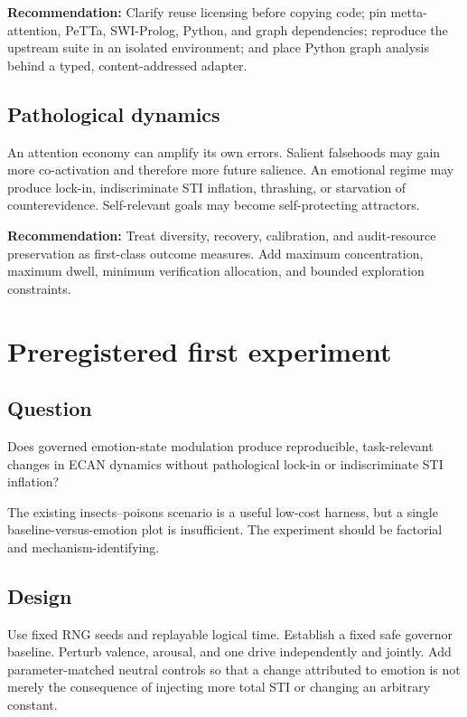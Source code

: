 \documentclass[11pt]{article}
\newcommand{\rec}{\textbf{Recommendation:} }
\begin{document}
\rec Clarify reuse licensing before copying code; pin metta-attention, PeTTa,
SWI-Prolog, Python, and graph dependencies; reproduce the upstream suite in an
isolated environment; and place Python graph analysis behind a typed,
content-addressed adapter.

\subsection{Pathological dynamics}

An attention economy can amplify its own errors.  Salient falsehoods may gain
more co-activation and therefore more future salience.  An emotional regime may
produce lock-in, indiscriminate STI inflation, thrashing, or starvation of
counterevidence.  Self-relevant goals may become self-protecting attractors.

\rec Treat diversity, recovery, calibration, and audit-resource preservation
as first-class outcome measures.  Add maximum concentration, maximum dwell,
minimum verification allocation, and bounded exploration constraints.

\section{Preregistered first experiment}

\subsection{Question}

Does governed emotion-state modulation produce reproducible, task-relevant
changes in ECAN dynamics without pathological lock-in or indiscriminate STI
inflation?

The existing insects--poisons scenario is a useful low-cost harness, but a
single baseline-versus-emotion plot is insufficient.  The experiment should be
factorial and mechanism-identifying.

\subsection{Design}

Use fixed RNG seeds and replayable logical time.  Establish a fixed safe
governor baseline.  Perturb valence, arousal, and one drive independently and
jointly.  Add parameter-matched neutral controls so that a change attributed to
emotion is not merely the consequence of injecting more total STI or changing
an arbitrary constant.
\end{document}
